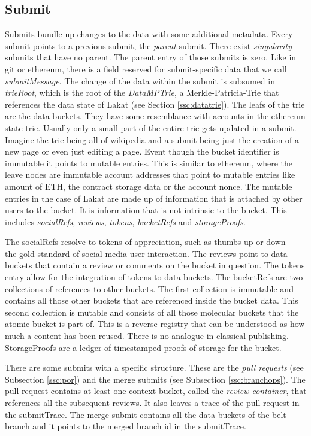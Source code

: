 \documentclass[14pt]{article}
\begin{document}
\subsection{Submit}
\label{ssc:submit}
Submits bundle up changes to the data with some additional metadata. Every submit points to a previous submit, the \textit{parent} submit. There exist \textit{singularity} submits that have no parent. The parent entry of those submits is zero. Like in git or ethereum, there is a field reserved for submit-specific data that we call \textit{submitMessage}. The change of the data within the submit is subsumed in \textit{trieRoot}, which is the root of the \textit{DataMPTrie}, a Merkle-Patricia-Trie that references the data state of Lakat (see Section \ref{ssc:datatrie}). The leafs of the trie are the data buckets. They have some resemblance with accounts in the ethereum state trie. Usually only a small part of the entire trie gets updated in a submit. Imagine the trie being all of wikipedia and a submit being just the creation of a new page or even just editing a page. Event though the bucket identifier is immutable it points to mutable entries. This is similar to ethereum, where the leave nodes are immutable account addresses that point to mutable entries like amount of ETH, the contract storage data or the account nonce. The mutable entries in the case of Lakat are made up of information that is attached by other users to the bucket. It is information that is not intrinsic to the bucket. This includes \textit{socialRefs}, \textit{reviews}, \textit{tokens}, \textit{bucketRefs} and \textit{storageProofs}. 

The socialRefs resolve to tokens of appreciation, such as thumbs up or down -- the gold standard of social media user interaction. The reviews point to data buckets that contain a review or comments on the bucket in question. The tokens entry allow for the integration of tokens to data buckets. The bucketRefs are two collections of references to other buckets. The first collection is immutable and contains all those other buckets that are referenced inside the bucket data. This second collection is mutable and consists of all those molecular buckets that the atomic bucket is part of. This is a reverse registry that can be understood as how much a content has been reused. There is no analogue in classical publishing. StorageProofs are a ledger of timestamped proofs of storage for the bucket.  

There are some submits with a specific structure. These are the \textit{pull requests} (see Subsection \ref{ssc:por}) and the merge submits (see Subsection \ref{ssc:branchops}). The pull request  contains at least one context bucket, called the \textit{review container}, that references all the subsequent reviews. It also leaves a trace of the pull request in the submitTrace. The merge submit contains 
all the data buckets of the belt branch and it points to the merged branch id in the submitTrace. 
\end{document}
